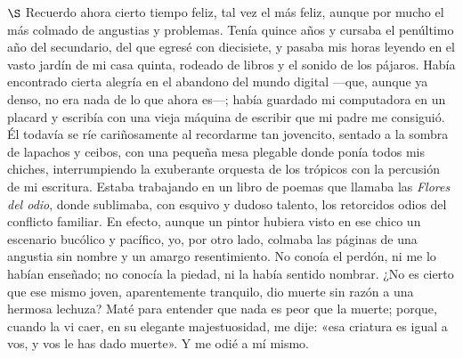 \documentclass[a4paper, 12pt]{article}
\begin{document}
\newpage

$\S$ Recuerdo ahora cierto tiempo feliz, tal vez el más feliz, aunque por mucho
el más colmado de angustias y problemas. Tenía quince años y cursaba el
penúltimo año del secundario, del que egresé con diecisiete, y pasaba mis horas
leyendo en el vasto jardín de mi casa quinta, rodeado de libros y el sonido de
los pájaros. Había encontrado cierta alegría en el abandono del mundo digital
---que, aunque ya denso, no era nada de lo que ahora es---; había guardado mi
computadora en un placard y escribía con una vieja máquina de escribir que mi
padre me consiguió. Él todavía se ríe cariñosamente al recordarme tan jovencito,
sentado a la sombra de lapachos y ceibos, con una pequeña mesa plegable donde
ponía todos mis chiches, interrumpiendo la exuberante orquesta de los trópicos
con la percusión de mi escritura. Estaba trabajando en un libro de poemas que
llamaba las \textit{Flores del odio}, donde sublimaba, con esquivo y dudoso
talento, los retorcidos odios del conflicto familiar. En efecto, aunque un
pintor hubiera visto en ese chico un escenario bucólico y pacífico, yo, por otro
lado, colmaba las páginas de una angustia sin nombre y un amargo resentimiento.
No conoía el perdón, ni me lo habían enseñado; no conocía la piedad, ni la había
sentido nombrar. ¿No es cierto que ese mismo joven, aparentemente tranquilo,
dio muerte sin razón a una hermosa lechuza? Maté para entender que nada es peor
que la muerte; porque, cuando la vi caer, en su elegante majestuosidad, me dije:
«esa criatura es igual a vos, y vos le has dado muerte». Y me odié a mí mismo.

\newpage
\end{document}
